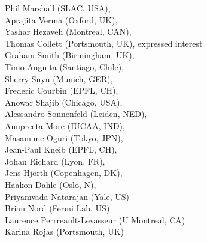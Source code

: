 \documentclass[11pt, letterpaper]{article}
\begin{document}
Phil Marshall (SLAC, USA), \\%
Aprajita Verma (Oxford, UK), \\%
Yashar Hezaveh (Montreal, CAN), \\%
Thomas Collett (Portsmouth, UK), expressed interest\\%
Graham Smith (Birmingham, UK), \\%
Timo Anguita (Santiago, Chile), \\%
Sherry Suyu (Munich, GER), \\%
Frederic Courbin (EPFL, CH), \\%
Anowar Shajib (Chicago, USA), \\%
Alessandro Sonnenfeld (Leiden, NED), \\%
Anupreeta More (IUCAA, IND), \\%
Masamune Oguri (Tokyo, JPN), \\
Jean-Paul Kneib (EPFL, CH),\\
Johan Richard (Lyon, FR), \\
Jens Hjorth (Copenhagen, DK), \\
Haakon Dahle (Oslo, N), \\
Priyamvada Natarajan (Yale, US) \\
Brian Nord (Fermi Lab, US) \\%
Laurence Perrreault-Levasseur (U Montreal, CA) \\%
Karina Rojas (Portsmouth, UK) \\%



\end{document}
